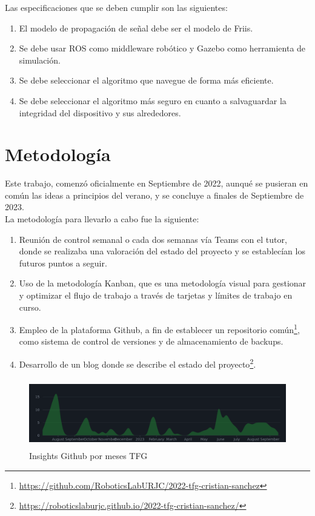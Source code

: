 Las especificaciones que se deben cumplir son las siguientes:

\begin{enumerate}
	\item El modelo de propagación de señal debe ser el modelo de Friis.
	\item Se debe usar \ac{ROS} como middleware robótico y Gazebo como herramienta de simulación.
	\item Se debe seleccionar el algoritmo que navegue de forma más eficiente.
	\item Se debe seleccionar el algoritmo más seguro en cuanto a salvaguardar la integridad del dispositivo y sus alrededores.
\end{enumerate}

\section{Metodología}
\label{sec:metodologia}

Este trabajo, comenzó oficialmente en Septiembre de 2022, aunqué se pusieran en común las ideas a principios del verano, y se concluye a finales de Septiembre de 2023.\\ 

La metodología para llevarlo a cabo fue la siguiente:

\begin{enumerate}
	\item Reunión de control semanal o cada dos semanas vía Teams con el tutor, donde se realizaba una valoración del estado del proyecto y se establecían los futuros puntos a seguir.
	\item Uso de la metodología Kanban, que es una metodología visual para gestionar y optimizar el flujo de trabajo a través de tarjetas y límites de trabajo en curso.
	\item Empleo de la plataforma Github, a fin de establecer un repositorio común\footnote[1]{\url{https://github.com/RoboticsLabURJC/2022-tfg-cristian-sanchez}}, como sistema de control de versiones y de almacenamiento de backups.
	\item Desarrollo de un blog donde se describe el estado del proyecto\footnote[2]{\url{https://roboticslaburjc.github.io/2022-tfg-cristian-sanchez/}}.
\end{enumerate}

\begin{figure} [H]
	\begin{center}
	\includegraphics[height=3cm]{imagenes/cap2/1_insights.png}
	\end{center}
	\caption[Insights Github por meses \ac{TFG}]{Insights Github por meses \ac{TFG}}
	\label{fig:insights}
\end{figure}

